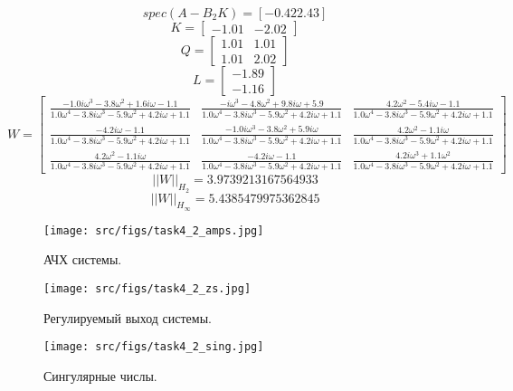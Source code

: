   \FloatBarrier

\[spec(A-B_2 K) = [-0.42  2.43]\]
\[K = \begin{bmatrix}
 -1.01 & -2.02
\end{bmatrix}\]
\[Q = \begin{bmatrix}
  1.01 &  1.01\\
  1.01 &  2.02
\end{bmatrix}\]
\[L = \begin{bmatrix}
 -1.89\\
 -1.16
\end{bmatrix}\]
\[ W = \left[\begin{matrix}\frac{- 1.0 i \omega^{3} - 3.8 \omega^{2} + 1.6 i \omega - 1.1}{1.0 \omega^{4} - 3.8 i \omega^{3} - 5.9 \omega^{2} + 4.2 i \omega + 1.1} & \frac{- i \omega^{3} - 4.8 \omega^{2} + 9.8 i \omega + 5.9}{1.0 \omega^{4} - 3.8 i \omega^{3} - 5.9 \omega^{2} + 4.2 i \omega + 1.1} & \frac{4.2 \omega^{2} - 5.4 i \omega - 1.1}{1.0 \omega^{4} - 3.8 i \omega^{3} - 5.9 \omega^{2} + 4.2 i \omega + 1.1}\\\frac{- 4.2 i \omega - 1.1}{1.0 \omega^{4} - 3.8 i \omega^{3} - 5.9 \omega^{2} + 4.2 i \omega + 1.1} & \frac{- 1.0 i \omega^{3} - 3.8 \omega^{2} + 5.9 i \omega}{1.0 \omega^{4} - 3.8 i \omega^{3} - 5.9 \omega^{2} + 4.2 i \omega + 1.1} & \frac{4.2 \omega^{2} - 1.1 i \omega}{1.0 \omega^{4} - 3.8 i \omega^{3} - 5.9 \omega^{2} + 4.2 i \omega + 1.1}\\\frac{4.2 \omega^{2} - 1.1 i \omega}{1.0 \omega^{4} - 3.8 i \omega^{3} - 5.9 \omega^{2} + 4.2 i \omega + 1.1} & \frac{- 4.2 i \omega - 1.1}{1.0 \omega^{4} - 3.8 i \omega^{3} - 5.9 \omega^{2} + 4.2 i \omega + 1.1} & \frac{4.2 i \omega^{3} + 1.1 \omega^{2}}{1.0 \omega^{4} - 3.8 i \omega^{3} - 5.9 \omega^{2} + 4.2 i \omega + 1.1}\end{matrix}\right] \]
\[||W||_{H_2} = 3.9739213167564933\]
\[||W||_{H_\infty} = 5.4385479975362845 \]

  \begin{figure}[ht!]
    \centering
    \texttt{[image: src/figs/task4\_2\_amps.jpg]}
    \caption{АЧХ системы.}
    \label{fig:task4_2_amps}
  \end{figure}
  
  \begin{figure}[ht!]
    \centering
    \texttt{[image: src/figs/task4\_2\_zs.jpg]}
    \caption{Регулируемый выход системы.}
    \label{fig:task4_2_zs}
  \end{figure}
  
  \begin{figure}[ht!]
    \centering
    \texttt{[image: src/figs/task4\_2\_sing.jpg]}
    \caption{Сингулярные числы.}
    \label{fig:task4_2_sing}
  \end{figure}

  \FloatBarrier